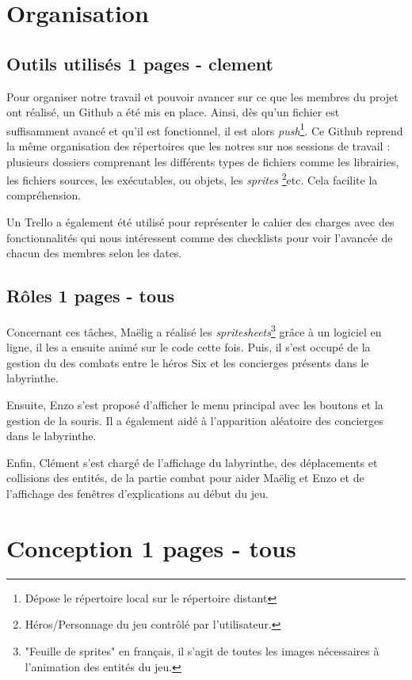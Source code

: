 \documentclass[10pt]{article}
\begin{document}
\section{Organisation}   
   \subsection{Outils utilisés 1 pages - clement}
   Pour organiser notre travail et pouvoir avancer sur ce que les membres du projet ont réalisé, un Github a été mis en place. Ainsi, dès qu'un fichier est
   suffisamment avancé et qu'il est fonctionnel, il est alors \textit{push}\footnote{Dépose le répertoire local sur le répertoire distant}.
   Ce Github reprend la même organisation des répertoires que les notres sur nos sessions de travail : plusieurs dossiers comprenant les différents types 
   de fichiers comme les librairies, les fichiers sources, les exécutables, ou objets, les \textit{sprites}
   \footnote{Héros/Personnage du jeu contrôlé par l'utilisateur.}etc. Cela facilite la compréhension.

   Un Trello a également été utilisé pour représenter le cahier des charges avec des 
   fonctionnalités qui nous intéressent comme des checklists pour voir l'avancée de chacun des membres selon les dates.
   \subsection{Rôles 1 pages - tous}
   Concernant ces tâches, Maëlig a réalisé les \textit{spritesheets}\footnote{"Feuille de sprites" en français, il s'agit de toutes les images nécessaires
   à l'animation des entités du jeu.} grâce à un logiciel en ligne, il les a ensuite animé sur le code cette fois. Puis, il s'est occupé de la gestion du 
   des combats entre le héros Six et les concierges présents dans le labyrinthe.

   Ensuite, Enzo s'est proposé d'afficher le menu principal avec les boutons et la gestion de la souris. Il a également aidé à l'apparition aléatoire des 
   concierges dans le labyrinthe. 
   
   Enfin, Clément s'est chargé de l'affichage du labyrinthe, des déplacements et collisions des entités, de la partie combat pour aider Maëlig et Enzo
   et de l'affichage des fenêtres d'explications au début du jeu.
\section{Conception 1 pages - tous}
\end{document}
